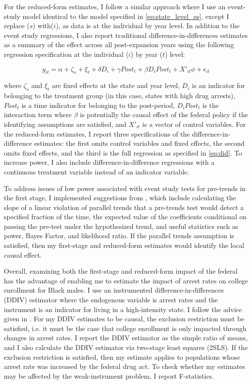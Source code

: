 \documentclass{article}
\begin{document}
For the reduced-form estimates, I follow a similar approach where I use an event-study model identical to the model specified in \ref{eq:state_level_es}, except I replace ($s$) with($i$), as data is at the individual by year level. In addition to the event study regressions, I also report traditional difference-in-differences estimates as a summary of the effect across all post-expansion years using the following regression specification at the individual ($i$) by year ($t$) level: 

\begin{equation} \label{eq:did}
  y_{it} = \alpha + \zeta_s + \xi_t + \delta D_i + \gamma Post_t + \beta D_i Post_t + X'_{it}\phi + \epsilon_{it}
\end{equation}

where $\zeta_s$ and $\xi_t$ are fixed effects at the state and year level, $D_{i}$ is an indicator for belonging to the treatment group (in this case, states with high drug arrests), $Post_t$ is a time indicator for belonging to the post-period, $D_i Post_t$ is the interaction term where $\beta$ is potentially the causal effect of the federal policy if the identifying assumptions are satisfied, and $X'_{it}$ is a vector of control variables. For the reduced-form estimates, I report three specifications of the difference-in-difference estimates: the first omits control variables and fixed effects, the second omits fixed effects, and the third is the full regression as specified in \ref{eq:did}. To increase power, I also include difference-in-difference regressions with a continuous treatment variable instead of an indicator variable.

To address issues of low power associated with event study tests for pre-trends in the first stage, I implemented suggestions from \cite{roth2022}, which include calculating the slope of a linear violation of parallel trends that a pre-trends test would detect a specified fraction of the time, the expected value of the coefficients conditional on passing the pre-test under the hypothesized trend, and useful statistics such as power, Bayes Factor, and likelihood ratio. If the parallel trends assumption is satisfied, then my first-stage and reduced-form estimates would identify the local causal effect.

Overall, examining both the first-stage and reduced-form impact of the federal has the advantage of enabling me to estimate the impact of arrest rates on college enrollment for Black males. I use an instrumented difference-in-differences (DDIV) estimator where the endogenous variable is arrest rates and the instrument is an indicator for living in a high-intensity state. I follow the advice given in \cite{ddiv}. For my DDIV estimates to be causal, the exclusion restriction must be satisfied, i.e. it must be the case that college enrollment is only impacted through changes in arrest rates.  I report the DDIV estimator as the simple ratio of means, and I also calculate the DDIV estimator via two-stage least squares (2SLS). If the exclusion restriction is satisfied, then my estimate applies to populations whose arrest rate was increased by the federal drug act. To check whether my estimates may be affected by the weak-instrument problem, I report F-statistics.
\end{document}

